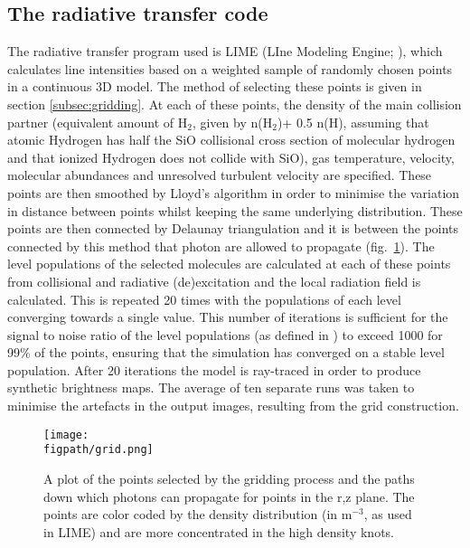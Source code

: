 \documentclass[useAMS,usenatbib]{mn2e}
\newcommand{\figpath}{/Users/bhargavvaidya/MyProject/work/Leeds_Uni/SiOJets_New/PAPER/PFIGS/}
\begin{document}
\subsection{The radiative transfer code} \label{subsec:radiative_transfer_code}
The radiative transfer program used is LIME (LIne Modeling Engine; \citealt{Brinch:2010p13078}), which  calculates line intensities based on a weighted sample of randomly chosen points in a continuous 3D model. The method of selecting these points is given in section \ref{subsec:gridding}. At each of these points, the density of the main collision partner (equivalent amount of H$_2$, given by n(H$_2$)+ 0.5 n(H), assuming that atomic Hydrogen has half the SiO collisional cross section of molecular hydrogen and that ionized Hydrogen does not collide with SiO), gas temperature, velocity, molecular abundances and unresolved turbulent velocity are specified. These points are then smoothed by Lloyd's algorithm \citep{Lloyd1982} in order to minimise the variation in distance between points whilst keeping the same underlying distribution. These points are then connected by Delaunay triangulation and it is between the points connected by this method that photon are allowed to propagate (fig.~\ref{grid}). The level populations of the selected molecules are calculated at each of these points from collisional and radiative (de)excitation and the local radiation field is calculated. This is repeated 20 times with the populations of each level converging towards a single value. This number of iterations is sufficient for the signal to noise ratio of the level populations (as defined in \citealt{Brinch:2010p13078}) to exceed 1000 for 99\% of the points, ensuring that the simulation has converged on a stable level population. After 20 iterations the model is ray-traced in order to produce synthetic brightness maps. The average of ten separate runs was taken to minimise the artefacts in the output images, resulting from the grid construction.%


\begin{figure}
 \texttt{[image: \\figpath/grid.png]}
 \caption{A plot of the points selected by the gridding process and the paths down which photons can propagate for points in the r,z plane. The points are color coded by the density distribution (in m$^{-3}$, as used in LIME) and are more concentrated in the high density knots.}
\label{grid} %
\end{figure}
\end{document}
